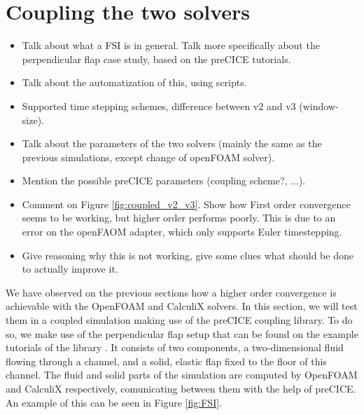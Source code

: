 \documentclass[
  english,        %
  font=times,     %
  onecolumn,      %
]{tumarticle}
\begin{document}
\section{Coupling the two solvers}
\begin{itemize}
    \item Talk about what a FSI is in general. Talk more specifically about the perpendicular flap case study, based on the preCICE tutorials.
    \item Talk about the automatization of this, using scripts.
    \item Supported time stepping schemes, difference between v2 and v3 (window-size).
    \item Talk about the parameters of the two solvers (mainly the same as the previous simulations, except change of openFOAM solver). 
    \item Mention the possible preCICE parameters (coupling scheme?, ...).
    \item Comment on Figure \ref{fig:coupled_v2_v3}. Show how First order convergence seems to be working, but higher order performs poorly. This is due to an error on the openFAOM adapter, which only supports Euler timestepping.
    \item Give reasoning why this is not working, give some clues what should be done to actually improve it.
\end{itemize} 

We have observed on the previous sections how a higher order convergence is achievable with the OpenFOAM and CalculiX solvers. In this section, we will test them in a coupled simulation making use of the preCICE coupling library. To do so, we make use of the perpendicular flap setup that can be found on the example tutorials of the library \cite{perpendicularFlap}. It consists of two components, a two-dimensional fluid flowing through a channel, and a solid, elastic flap fixed to the floor of this channel. The fluid and solid parts of the simulation are computed by OpenFOAM and CalculiX respectively, comunicating between them with the help of preCICE. An example of this can be seen in Figure \ref{fig:FSI}.
\end{document}
